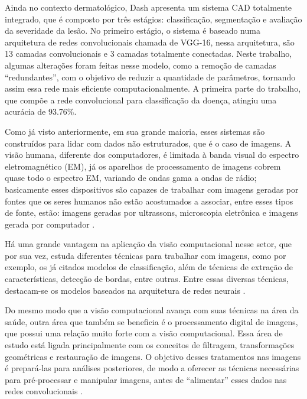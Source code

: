Ainda no contexto dermatológico, \citeauthor{DASH2020106240} Dash apresenta um sistema CAD totalmente integrado, que é composto por três estágios: classificação, segmentação e avaliação da severidade da lesão. No primeiro estágio, o sistema é baseado numa arquitetura de redes convolucionais chamada de VGG-16, nessa arquitetura, são 13 camadas convolucionais e 3 camadas totalmente conectadas. Neste trabalho, algumas alterações foram feitas nesse modelo, como a remoção de camadas “redundantes”, com o objetivo de reduzir a quantidade de parâmetros, tornando assim essa rede mais eficiente computacionalmente. A primeira parte do trabalho, que compõe a rede convolucional para classificação da doença, atingiu uma acurácia de 93.76\%.


Como já visto anteriormente, em sua grande maioria, esses sistemas são construídos para lidar com dados não estruturados, que é o caso de imagens. A visão humana, diferente dos computadores, é limitada à banda visual do espectro eletromagnético (EM), já os aparelhos de processamento de imagens cobrem quase todo o espectro EM, variando de ondas gama a ondas de rádio; basicamente esses dispositivos são capazes de trabalhar com imagens geradas por fontes que os seres humanos não estão acostumados a associar, entre esses tipos de fonte, estão: imagens geradas por ultrassons, microscopia eletrônica e imagens gerada por computador \cite{gonzalez2008digital}. 


Há uma grande vantagem na aplicação da visão computacional nesse setor, que por sua vez, estuda diferentes técnicas para trabalhar com imagens, como por exemplo, os já citados modelos de classificação, além de técnicas de extração de características, detecção de bordas, entre outras. Entre essas diversas técnicas, destacam-se os modelos baseados na arquitetura de redes neurais \cite{DOI2007198}.


Do mesmo modo que a visão computacional avança com suas técnicas na área da saúde, outra área que também se beneficia é o processamento digital de imagens, que possui uma relação muito forte com a visão computacional. Essa área de estudo está ligada principalmente com os conceitos de filtragem, transformações geométricas e restauração de imagens. O objetivo desses tratamentos nas imagens é prepará-las para análises posteriores, de modo a oferecer as técnicas necessárias para pré-processar e manipular imagens, antes de “alimentar” esses dados nas redes convolucionais \cite{gonzalez2008digital}.

